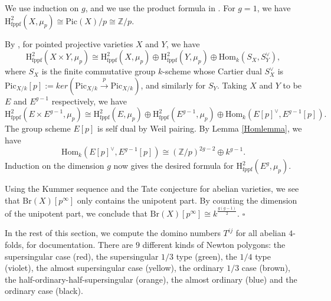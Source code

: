 \documentclass[a4paper,12pt,twoside]{report}
\newcommand{\Z}{\mathbb{Z}}
\newcommand{\fppf}{\mathrm{fppf}}
\newcommand{\Pic}{\mathrm{Pic}}
\newcommand{\Br}{\mathrm{Br}}
\newcommand{\HH}{\mathrm{H}}
\newcommand{\Hom}{\mathrm{Hom}}
\begin{document}
 We use induction on $g$, and we use the product formula in \cite{Sk}. 
For $g=1$, we have $\HH^2_{\fppf}(X,\mu_p)\cong \Pic(X)/p\cong \Z/p$. 

By \cite[Theorem 1.3]{Sk}, for pointed projective varieties $X$ and $Y$, we have
\[ \HH^2_{\fppf}(X\times Y,\mu_{p})\cong \HH^2_{\fppf}(X,\mu_{p})\oplus \HH^2_{\fppf}(Y,\mu_{p}) \oplus \Hom_k(S_X,S_Y^{\vee}),\]
where $S_X$ is the finite commutative group $k$-scheme whose Cartier dual $S_X^{\vee}$ is $\Pic_{X/k}[p]:=ker(\Pic_{X/k}\xrightarrow{p} \Pic_{X/k})$, and similarly for $S_Y$.
Taking $X$ and $Y$ to be $E$ and $E^{g-1}$ respectively, 
we have \begin{equation}
    \HH^2_{\fppf}(E\times E^{g-1},\mu_p)\cong \HH^2_{\fppf}(E,\mu_{p})\oplus \HH^2_{\fppf}(E^{g-1},\mu_{p}) \oplus \Hom_k(E[p]^{\vee},E^{g-1}[p]).
\end{equation} 
The group scheme $E[p]$ is self dual by Weil pairing. By Lemma \ref{Homlemma}, we have 
\begin{equation}
    \Hom_k(E[p]^{\vee},E^{g-1}[p])\cong (\Z/p)^{ 2g-2}\oplus k^{g-1}.
\end{equation}
Induction on the dimension $g$ now gives the desired formula for $\HH^2_{\fppf}(E^{g},\mu_p)$.

Using the Kummer sequence and the Tate conjecture for abelian varieties, 
we see that $\Br(X)[p^\infty]$ only contains the unipotent part. 
By counting the dimension of the unipotent part, we conclude that $\Br(X)[p^{\infty}]\cong k^{\frac{g(g-1)}{2}}$. $\square$

\medskip

In the rest of this section, we compute the domino numbers $T^{ij}$ for all abelian $4$-folds, 
for documentation. There are $9$ different kinds of Newton polygons: 
the supersingular case (red), the supersingular $1/3$ type (green), the $1/4$ type (violet), the almost supersingular case (yellow), 
the ordinary $1/3$ case (brown), the half-ordinary-half-supersingular (orange), the almost ordinary (blue) and the ordinary case (black). 

\begin{center}
\end{center}
\end{document}
